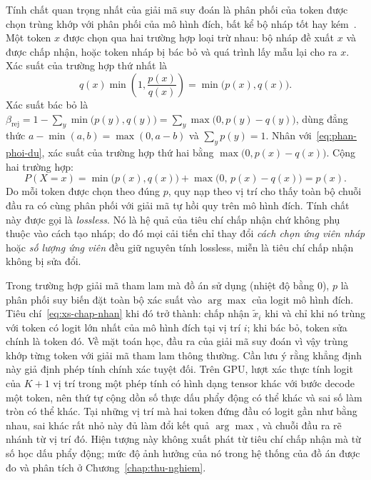 Tính chất quan trọng nhất của giải mã suy đoán là phân phối của token được chọn trùng khớp với phân phối của mô hình đích, bất kể bộ nháp tốt hay kém~\cite{leviathan2023speculative}. Một token $x$ được chọn qua hai trường hợp loại trừ nhau: bộ nháp đề xuất $x$ và được chấp nhận, hoặc token nháp bị bác bỏ và quá trình lấy mẫu lại cho ra $x$. Xác suất của trường hợp thứ nhất là
\begin{equation}
  q(x)\min\!\left(1,\frac{p(x)}{q(x)}\right) = \min\bigl(p(x), q(x)\bigr).
\end{equation}
Xác suất bác bỏ là $\beta_{\text{rej}} = 1-\sum_{y}\min\bigl(p(y),q(y)\bigr) = \sum_{y}\max\bigl(0, p(y)-q(y)\bigr)$, dùng đẳng thức $a-\min(a,b)=\max(0,a-b)$ và $\sum_y p(y)=1$. Nhân với~\eqref{eq:phan-phoi-du}, xác suất của trường hợp thứ hai bằng $\max\bigl(0, p(x)-q(x)\bigr)$. Cộng hai trường hợp:
\begin{equation}\label{eq:bao-toan}
  P(X=x) = \min\bigl(p(x),q(x)\bigr) + \max\bigl(0,\,p(x)-q(x)\bigr) = p(x).
\end{equation}
Do mỗi token được chọn theo đúng $p$, quy nạp theo vị trí cho thấy toàn bộ chuỗi đầu ra có cùng phân phối với giải mã tự hồi quy trên mô hình đích. Tính chất này được gọi là \textit{lossless}. Nó là hệ quả của tiêu chí chấp nhận chứ không phụ thuộc vào cách tạo nháp; do đó mọi cải tiến chỉ thay đổi \emph{cách chọn ứng viên nháp} hoặc \emph{số lượng ứng viên} đều giữ nguyên tính lossless, miễn là tiêu chí chấp nhận không bị sửa đổi.

Trong trường hợp giải mã tham lam mà đồ án sử dụng (nhiệt độ bằng 0), $p$ là phân phối suy biến đặt toàn bộ xác suất vào $\arg\max$ của logit mô hình đích. Tiêu chí~\eqref{eq:xs-chap-nhan} khi đó trở thành: chấp nhận $\tilde{x}_i$ khi và chỉ khi nó trùng với token có logit lớn nhất của mô hình đích tại vị trí $i$; khi bác bỏ, token sửa chính là token đó. Về mặt toán học, đầu ra của giải mã suy đoán vì vậy trùng khớp từng token với giải mã tham lam thông thường. Cần lưu ý rằng khẳng định này giả định phép tính chính xác tuyệt đối. Trên GPU, lượt xác thực tính logit của $K+1$ vị trí trong một phép tính có hình dạng tensor khác với bước decode một token, nên thứ tự cộng dồn số thực dấu phẩy động có thể khác và sai số làm tròn có thể khác. Tại những vị trí mà hai token đứng đầu có logit gần như bằng nhau, sai khác rất nhỏ này đủ làm đổi kết quả $\arg\max$, và chuỗi đầu ra rẽ nhánh từ vị trí đó. Hiện tượng này không xuất phát từ tiêu chí chấp nhận mà từ số học dấu phẩy động; mức độ ảnh hưởng của nó trong hệ thống của đồ án được đo và phân tích ở Chương~\ref{chap:thu-nghiem}.

